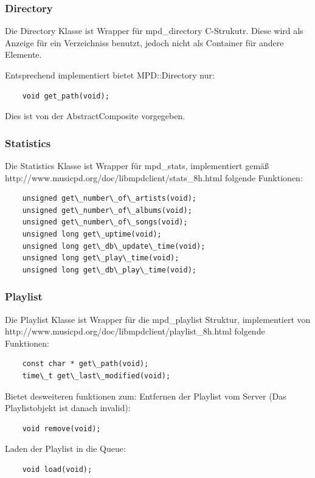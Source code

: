\subsubsection{Directory}
Die Directory Klasse ist Wrapper für mpd\_directory C-Strukutr. Diese wird als Anzeige für ein Verzeichniss benutzt,
jedoch nicht als Container für andere Elemente.

Entsprechend implementiert bietet MPD::Directory nur:
\begin{verbatim}
    void get_path(void);
\end{verbatim}

Dies ist von der AbstractComposite vorgegeben.


\newpage
\subsubsection{Statistics}
Die Statistics Klasse ist Wrapper für mpd\_stats, implementiert gemäß
\\http://www.musicpd.org/doc/libmpdclient/stats\_8h.html
folgende Funktionen:
\begin{verbatim}
    unsigned get\_number\_of\_artists(void);
    unsigned get\_number\_of\_albums(void);
    unsigned get\_number\_of\_songs(void);
    unsigned long get\_uptime(void);
    unsigned long get\_db\_update\_time(void);
    unsigned long get\_play\_time(void);
    unsigned long get\_db\_play\_time(void);
\end{verbatim}


\subsubsection{Playlist}
Die Playlist Klasse ist Wrapper für die mpd\_playlist Struktur, implementiert von http://www.musicpd.org/doc/libmpdclient/playlist\_8h.html folgende Funktionen:
\begin{verbatim}
    const char * get\_path(void);
    time\_t get\_last\_modified(void);
\end{verbatim}

Bietet desweiteren funktionen zum:
Entfernen der Playlist vom Server (Das Playlistobjekt ist danach invalid):
\begin{verbatim}
    void remove(void);
\end{verbatim}

Laden der Playlist in die Queue:
\begin{verbatim}
    void load(void);
\end{verbatim}


